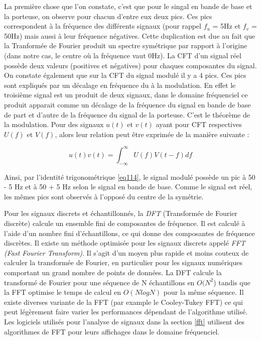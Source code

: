 La première chose que l'on constate, c'est que pour le singal en bande de base et la porteuse, on observe pour chacun d'entre eux deux pics. Ces pics correspondent à la fréquence des différents signaux (pour rappel $f_u$ = 5Hz et $f_v$ = 50Hz) mais aussi à leur fréquence négatives. Cette duplication est due au fait que la Tranformée de Fourier produit un spectre symétrique par rapport à l'origine (dans notre cas, le centre où la fréquence vaut 0Hz). La CFT d'un signal réel possède deux valeurs (positives et négatives) pour chaques composantes du signal. On constate également que sur la CFT du signal modulé il y a 4 pics. Ces pics sont expliqués par un décalage en fréquence du à la modulation. En effet le troisième signal est un produit de deux signaux, dans le domaine fréquenciel ce produit apparait comme un décalage de la fréquence du signal en bande de base de part et d'autre de la fréquence du signal de la porteuse. C'est le théorème de la modulation. Pour des signaux $u(t)$ et $v(t)$ ayant pour CFT respectives $U(f)$ et $V(f)$, alors leur relation peut être exprimée de la manière suivante :

\begin{equation}
u(t)v(t) = \int_{-\infty}^{\infty} U(f)V(t - f) df
\end{equation}

Ainsi, par l'identité trigonométrique \ref{eq114}, le signal modulé possède un pic à 50 - 5 Hz et à 50 + 5 Hz selon le signal en bande de base. Comme le signal est réel, les mêmes pics sont observés à l'opposé du centre de la symétrie.

\vspace{0.1cm}

Pour les signaux discrets et échantillonnés, la \textit{DFT} (Transformée de Fourier discrète) calcule un ensemble fini de composantes de fréquence. Il est calculé à l’aide d’un nombre fini d’échantillons, ce qui donne des composantes de fréquence discrètes. Il existe un méthode optimisée pour les signaux discrets appelé \textit{FFT (Fast Fourier Transform)}\cite{fft}. Il s'agit d'un moyen plus rapide et moins couteux de calculer la transformée de Fourier, en particulier pour les signaux numériques comportant un grand nombre de points de données. La DFT calcule la transformé de Fourier pour une séquence de N échantillons en $O(N^2$) tandis que la FFT optimise le temps de calcul en $O(N log N)$ pour la même séquence. Il existe diverses variante de la FFT (par example le Cooley-Tukey FFT\cite{fft1}) ce qui peut légèrement faire varier les performances dépendant de l'algorithme utilisé. Les logiciels utilisés pour l'analyse de signaux dans la section \ref{fft} utilisent des algorithmes de FFT pour leurs affichages dans le domaine fréquenciel.

